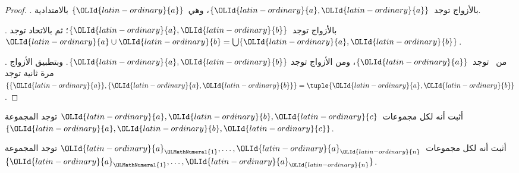 \documentclass[../../../include/open-logic-section]{subfiles}
\begin{document}
\begin{proof}
. بالأزواج توجد~$\{\OLId{latin-ordinary}{a}, \OLId{latin-ordinary}{a}\}$، وهي~$\{\OLId{latin-ordinary}{a}\}$
بالامتدادية.

. بالأزواج توجد~$\{\OLId{latin-ordinary}{a}, \OLId{latin-ordinary}{b}\}$؛ ثم بالاتحاد توجد
$\OLId{latin-ordinary}{a} \cup \OLId{latin-ordinary}{b} = \bigcup \{\OLId{latin-ordinary}{a}, \OLId{latin-ordinary}{b}\}$.

. من~ توجد~$\{\OLId{latin-ordinary}{a}\}$، ومن الأزواج توجد
$\{\OLId{latin-ordinary}{a},\OLId{latin-ordinary}{b}\}$. وبتطبيق الأزواج مرة ثانية توجد
$\{\{\OLId{latin-ordinary}{a}\}, \{\OLId{latin-ordinary}{a}, \OLId{latin-ordinary}{b}\}\} = \tuple{\OLId{latin-ordinary}{a}, \OLId{latin-ordinary}{b}}$.
\end{proof}

\begin{prob}
أثبت أنه لكل مجموعات~$\OLId{latin-ordinary}{a},\OLId{latin-ordinary}{b},\OLId{latin-ordinary}{c}$ توجد المجموعة~$\{\OLId{latin-ordinary}{a},\OLId{latin-ordinary}{b},\OLId{latin-ordinary}{c}\}$.
\end{prob}

\begin{prob}
أثبت أنه لكل مجموعات~$\OLId{latin-ordinary}{a}_\OLMathNumeral{1},\ldots,\OLId{latin-ordinary}{a}_\OLId{latin-ordinary}{n}$ توجد المجموعة
$\{\OLId{latin-ordinary}{a}_\OLMathNumeral{1},\ldots,\OLId{latin-ordinary}{a}_\OLId{latin-ordinary}{n}\}$.
\end{prob}

\end{document}
